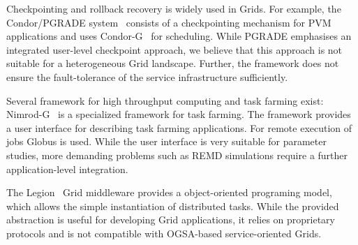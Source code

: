 \documentclass[times, 10pt,twocolumn]{article}
\newcommand{\alnote}[1]{ {\textcolor{blue} { ***AL: #1 }}}
\newcommand{\alnote}[1]{}
\begin{document}
%                                                 
                                             
     
                                             



Checkpointing and rollback recovery is widely used in Grids. For example, the Condor/PGRADE system~\cite{DBLP:conf/eagc/KovacsK04} consists 
of a checkpointing mechanism for PVM applications and uses Condor-G~\cite{citeulike:291860} for scheduling. 
While PGRADE emphasises an integrated user-level checkpoint approach, we believe 
that this approach is not suitable for a heterogeneous Grid landscape. Further, 
the framework does not ensure the fault-tolerance of the
service infrastructure sufficiently.
                                 
Several framework for high throughput computing and task farming exist:
Nimrod-G~\cite{buyya00nimrodg} is a specialized framework for task farming. The framework provides a user interface for describing task farming applications. For remote execution of jobs Globus is used. While the user interface is very suitable for parameter studies, more demanding problems such as REMD simulations require a further application-level integration.

The Legion~\cite{689541} Grid middleware provides a object-oriented programing model, which allows the simple instantiation of distributed tasks. While the provided abstraction is useful for developing Grid applications, it relies on proprietary protocols and is not compatible with OGSA-based service-oriented Grids.
\end{document}
